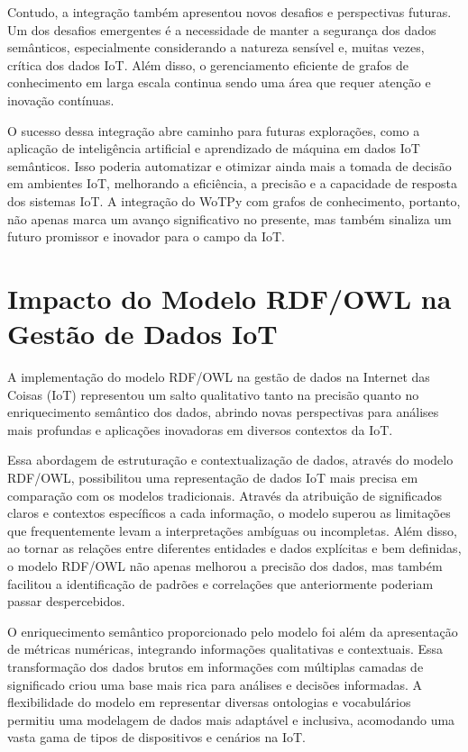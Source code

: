 Contudo, a integração também apresentou novos desafios e perspectivas futuras. Um dos desafios emergentes é a necessidade de manter a segurança dos dados semânticos, especialmente considerando a natureza sensível e, muitas vezes, crítica dos dados IoT. Além disso, o gerenciamento eficiente de grafos de conhecimento em larga escala continua sendo uma área que requer atenção e inovação contínuas.

O sucesso dessa integração abre caminho para futuras explorações, como a aplicação de inteligência artificial e aprendizado de máquina em dados IoT semânticos. Isso poderia automatizar e otimizar ainda mais a tomada de decisão em ambientes IoT, melhorando a eficiência, a precisão e a capacidade de resposta dos sistemas IoT. A integração do WoTPy com grafos de conhecimento, portanto, não apenas marca um avanço significativo no presente, mas também sinaliza um futuro promissor e inovador para o campo da IoT.

\section{Impacto do Modelo RDF/OWL na Gestão de Dados IoT}

A implementação do modelo RDF/OWL na gestão de dados na Internet das Coisas (IoT) representou um salto qualitativo tanto na precisão quanto no enriquecimento semântico dos dados, abrindo novas perspectivas para análises mais profundas e aplicações inovadoras em diversos contextos da IoT.

Essa abordagem de estruturação e contextualização de dados, através do modelo RDF/OWL, possibilitou uma representação de dados IoT mais precisa em comparação com os modelos tradicionais. Através da atribuição de significados claros e contextos específicos a cada informação, o modelo superou as limitações que frequentemente levam a interpretações ambíguas ou incompletas. Além disso, ao tornar as relações entre diferentes entidades e dados explícitas e bem definidas, o modelo RDF/OWL não apenas melhorou a precisão dos dados, mas também facilitou a identificação de padrões e correlações que anteriormente poderiam passar despercebidos.

O enriquecimento semântico proporcionado pelo modelo foi além da apresentação de métricas numéricas, integrando informações qualitativas e contextuais. Essa transformação dos dados brutos em informações com múltiplas camadas de significado criou uma base mais rica para análises e decisões informadas. A flexibilidade do modelo em representar diversas ontologias e vocabulários permitiu uma modelagem de dados mais adaptável e inclusiva, acomodando uma vasta gama de tipos de dispositivos e cenários na IoT.


